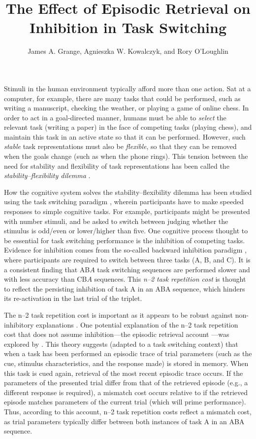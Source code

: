\documentclass[a4paper, doc, natbib]{apa6}
\title{The Effect of Episodic Retrieval on Inhibition in Task Switching}
\author{James A. Grange, Agnieszka W. Kowalczyk, and Rory O'Loughlin}
\affiliation{School of Psychology, Keele University, UK}
\begin{document}
\maketitle

Stimuli in the human environment typically afford more than one action. Sat at a computer, for example, there are many tasks that could be performed, such as writing a manuscript, checking the weather, or playing a game of online chess. In order to act in a goal-directed manner, humans must be able to \emph{select} the relevant task (writing a paper) in the face of competing tasks (playing chess), and maintain this task in an active state so that it can be performed. However, such \emph{stable} task representations must also be \emph{flexible}, so that they can be removed when the goals change (such as when the phone rings). This tension between the need for stability and flexibility of task representations has been called the \emph{stability--flexibility dilemma} \citep{Goschke2000}. 

How the cognitive system solves the stability--flexibility dilemma has been studied using the task switching paradigm \citep{Grange2014a,Kiesel2010,Vandierendonck2010}, wherein participants have to make speeded responses to simple cognitive tasks. For example, participants might be presented with number stimuli, and be asked to switch between judging whether the stimulus is odd/even or lower/higher than five. One cognitive process thought to be essential for task switching performance is the inhibition of competing tasks. Evidence for inhibition comes from the so-called backward inhibition paradigm \citep{Koch2010, Mayr2000}, where participants are required to switch between three tasks (A, B, and C).  It is a consistent finding that AB$A$ task switching sequences are performed slower and with less accuracy than CB$A$ sequences. This \emph{n--2 task repetition cost} is thought to reflect the persisting inhibition of task A in an ABA sequence, which hinders its re-activation in the last trial of the triplet.

The n--2 task repetition cost is important as it appears to be robust against non-inhibitory explanations \citep{Mayr2007}. One potential explanation of the n--2 task repetition cost that does not assume inhibition---the episodic retrieval account \citep{Neill1997}---was explored by \cite{Mayr2002}. This theory suggests (adapted to a task switching context) that when a task has been performed an episodic trace of trial parameters (such as the cue, stimulus characteristics, and the response made) is stored in memory. When this task is cued again, retrieval of the most recent episodic trace occurs. If the parameters of the presented trial differ from that of the retrieved episode (e.g., a different response is required), a mismatch cost occurs relative to if the retrieved episode matches parameters of the current trial (which will prime performance). Thus, according to this account, n--2 task repetition costs reflect a mismatch cost, as trial parameters typically differ between both instances of task A in an ABA sequence.
\end{document}

